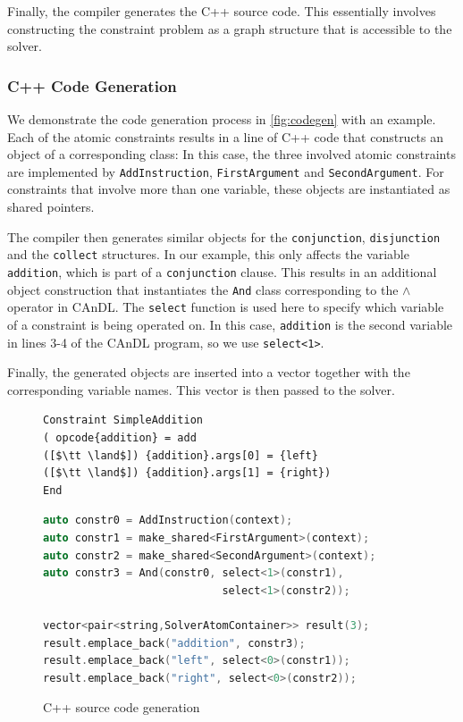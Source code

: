     Finally, the compiler generates the C++ source code.
    This essentially involves constructing the constraint problem as a graph
    structure that is accessible to the solver.

\subsubsection{C++ Code Generation}

    We demonstrate the code generation process in \autoref{fig:codegen} with an
    example.
    Each of the atomic constraints results in a line of C++ code that constructs
    an object of a corresponding class:
    In this case, the three involved atomic constraints are implemented by
    \texttt{AddInstruction}, \texttt{FirstArgument} and \texttt{SecondArgument}.
    For constraints that involve more than one variable, these objects are
    instantiated as shared pointers.

    The compiler then generates similar objects for the
    \texttt{conjunction}, \texttt{disjunction} and the \texttt{collect} structures.
    In our example, this only affects the variable \texttt{addition}, which is
    part of a \texttt{conjunction} clause.
    This results in an additional object construction that instantiates the
    \texttt{And} class corresponding to the {\bf $\land$} operator in CAnDL.
    The \texttt{select} function is used here to specify which variable of a
    constraint is being operated on.
    In this case, \texttt{addition} is the second variable in lines 3-4 of the
    CAnDL program, so we use \texttt{select<1>}.

    Finally, the generated objects are inserted into a vector together with the
    corresponding variable names.
    This vector is then passed to the solver.

\begin{figure}[ht]
\centering
\begin{lstlisting}[language=CAnDL]
Constraint SimpleAddition
( opcode{addition} = add
([$\tt \land$]) {addition}.args[0] = {left}
([$\tt \land$]) {addition}.args[1] = {right})
End
\end{lstlisting}
\begin{lstlisting}[language=C++]
auto constr0 = AddInstruction(context);
auto constr1 = make_shared<FirstArgument>(context);
auto constr2 = make_shared<SecondArgument>(context);
auto constr3 = And(constr0, select<1>(constr1),
                            select<1>(constr2));

vector<pair<string,SolverAtomContainer>> result(3);
result.emplace_back("addition", constr3);
result.emplace_back("left", select<0>(constr1));
result.emplace_back("right", select<0>(constr2));
\end{lstlisting}
\vspace{-0.3cm}
\caption{C++ source code generation}
\label{fig:codegen}
\end{figure}

